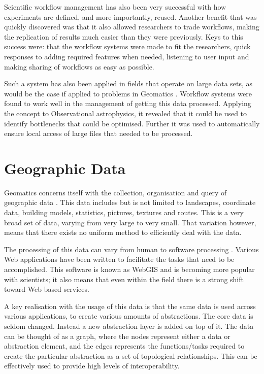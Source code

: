 \documentclass[12pt,a4paper]{report}
\begin{document}
Scientific workflow management has also been very successful with how
experiments are defined, and more importantly, reused. Another benefit that was
quickly discovered was that it also allowed researchers to trade workflows,
making the replication of results much easier than they were
previously\cite{4721191}. Keys to this success were: that the workflow systems
were made to fit the researchers, quick responses to adding required features
when needed, listening to user input and making sharing of workflows as easy as
possible.

Such a system has also been applied in fields that operate on large data
sets, as would be the case if applied to problems in Geomatics
\cite{Aragon:2009:WMH:1529282.1529491}.  Workflow systems were found to
work well in the management of getting this data processed. Applying the
concept to Observational astrophysics, it revealed that it could be used to
identify bottlenecks that could be optimised.  Further it was used to
automatically ensure local access of large files that needed to be processed.


\section{Geographic Data}
Geomatics concerns itself with the collection, organisation and query of
geographic data \cite{DiMartino:2007:TAG:1341012.1341081}.  This data includes
but  is not limited to landscapes, coordinate data, building models,
statistics, pictures, textures and routes. This is a very broad set of data,
varying from very large to very small.  That variation however, means that
there exists no uniform method to efficiently deal with the data.

The processing of this data can vary from human to software processing
\cite{DiMartino:2007:TAG:1341012.1341081}.  Various Web applications have been
written to facilitate the tasks that need to be accomplished.  This software is
known as WebGIS and is becoming more popular with scientists; it also means
that even within the field there is a strong shift toward Web based services.

A key realisation with the usage of this data is that the same data is used
across various applications, to create various amounts of
abstractions\cite{ElAdnani:2001:MLF:512161.512177}.  The core data is seldom
changed. Instead a new abstraction layer is added on top of it. The data can be
thought of as a graph, where the nodes represent either a data or abstraction
element, and the edges represents the functions/tasks required to create the
particular abstraction as a set of topological relationships. This can be
effectively used to provide high levels of interoperability.
\end{document}
